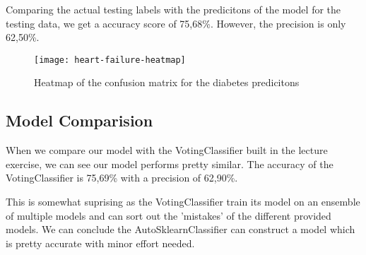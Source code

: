 Comparing the actual testing labels with the predicitons of the model for the testing data, we get a accuracy score of 75,68\%. However, the precision is only 62,50\%.

\begin{figure}[t]
  \begin{center}
    \texttt{[image: heart-failure-heatmap]}
    \caption{Heatmap of the confusion matrix for the diabetes predicitons}
  \end{center}
\end{figure}

\subsection{Model Comparision}

When we compare our model with the VotingClassifier built in the lecture exercise, we can see our model performs pretty similar. The accuracy of the VotingClassifier is 75,69\% with a precision of 62,90\%.

This is somewhat suprising as the VotingClassifier train its model on an ensemble of multiple models and can sort out the 'mistakes' of the different provided models. We can conclude the AutoSklearnClassifier can construct a model which is pretty accurate with minor effort needed.
